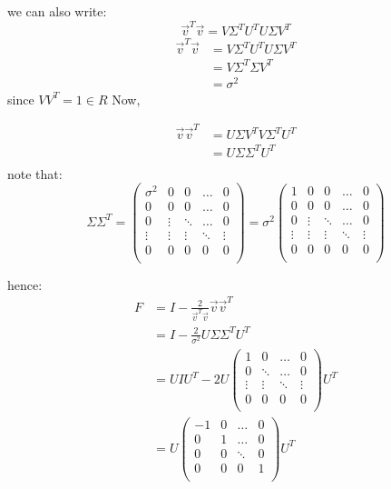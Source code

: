\documentclass[10pt]{article}
\begin{document}
we can also write:
\[
\vec{v}^T\vec{v} = V \Sigma^T U^T U \Sigma V^T 
\] 
\begin{align*}
  \vec{v}^T\vec{v} &= V \Sigma^T U^T U \Sigma V^T\\ 
                   &= V \Sigma^T \Sigma V^T\\
                   &= \sigma^2
\end{align*}
since $VV^T = 1 \in R$
Now, 

\begin{align*}
  \vec{v}\vec{v}^T &= U \Sigma V^T V \Sigma^T U^T \\
                   &= U \Sigma \Sigma^T U^T \\
\end{align*}
note that:
\[
\Sigma \Sigma^T =
 \begin{pmatrix}
  \sigma^2 &0& 0 & \dots & 0 \\
       0   &0& 0 & \dots & 0 \\
       0   &\vdots& \ddots & \dots & 0 \\
  \vdots   &\vdots& \vdots & \ddots & \vdots \\
       0   & 0&0 & 0  & 0 \\
 \end{pmatrix} = \sigma^2
 \begin{pmatrix}
  1 &0& 0 & \dots & 0 \\
       0   &0& 0 & \dots & 0 \\
       0   &\vdots& \ddots & \dots & 0 \\
  \vdots   &\vdots& \vdots & \ddots & \vdots \\
       0   & 0&0 & 0  & 0 \\
 \end{pmatrix} \]

hence:
\begin{align*}
F  &= I - \frac{2}{\vec{v}^T\vec{v}}\vec{v}\vec{v}^T \\
   &= I - \frac{2}{\sigma^2}U \Sigma \Sigma^T U^T \\
   &= U I U^T -2 U
 \begin{pmatrix}
  1 & 0 & \dots & 0 \\
       0   & \ddots & \dots & 0 \\
  \vdots   & \vdots & \ddots & \vdots \\
       0   & 0 & 0  & 0 \\
 \end{pmatrix} U^T \\
   &= U \begin{pmatrix}
  -1   & 0 & \dots & 0 \\
   0   & 1 & \dots & 0 \\
   0   & 0 & \ddots & 0 \\
   0   & 0 &  0 & 1 \\
 \end{pmatrix}U^T 
\end{align*}
\end{document}
